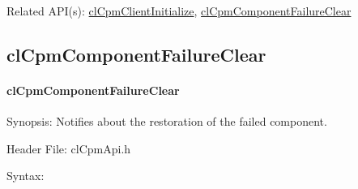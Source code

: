 {\begin{Desc}
\item[Related API(s):]\hyperlink{group__group14}{cl\-Cpm\-Client\-Initialize}, \hyperlink{group__group14}{cl\-Cpm\-Component\-Failure\-Clear} \end{Desc}

\newpage





\subsection{clCpmComponentFailureClear}
\hypertarget{pagecpm122}{}\paragraph{cl\-Cpm\-Component\-Failure\-Clear}\label{pagecpm122}
\begin{Desc}
\item[Synopsis:]Notifies about the restoration of the failed component.\end{Desc}
\begin{Desc}
\item[Header File:]clCpmApi.h\end{Desc}
\begin{Desc}
\item[Syntax:]


\end{Desc}}
